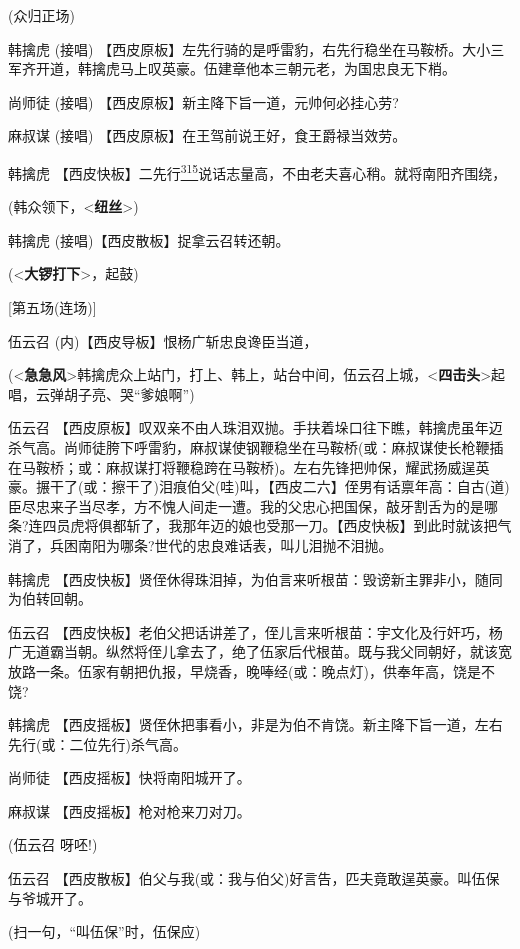 (众归正场)

韩擒虎 (接唱)
【西皮原板】左先行骑的是呼雷豹，右先行稳坐在马鞍桥。大小三军齐开道，韩擒虎马上叹英豪。伍建章他本三朝元老，为国忠良无下梢。

尚师徒 (接唱) 【西皮原板】新主降下旨一道，元帅何必挂心劳?

麻叔谋 (接唱) 【西皮原板】在王驾前说王好，食王爵禄当效劳。

韩擒虎
【西皮快板】二先行\protect\hyperlink{fn315}{\textsuperscript{315}}说话志量高，不由老夫喜心稍。就将南阳齐围绕，

(韩众领下，\textless{}\textbf{纽丝}\textgreater{})

韩擒虎 (接唱)【西皮散板】捉拿云召转还朝。

(\textless{}\textbf{大锣打下}\textgreater{}，起鼓)

{[}第五场(连场){]}

伍云召 (内)【西皮导板】恨杨广斩忠良谗臣当道，

(\textless{}\textbf{急急风}\textgreater{}韩擒虎众上站门，打上、韩上，站台中间，伍云召上城，\textless{}\textbf{四击头}\textgreater{}起唱，云弹胡子亮、哭``爹娘啊'')

伍云召
【西皮原板】叹双亲不由人珠泪双抛。手扶着垛口往下瞧，韩擒虎虽年迈杀气高。尚师徒胯下呼雷豹，麻叔谋使钢鞭稳坐在马鞍桥(或：麻叔谋使长枪鞭插在马鞍桥；或：麻叔谋打将鞭稳跨在马鞍桥)。左右先锋把帅保，耀武扬威逞英豪。搌干了(或：擦干了)泪痕伯父(哇)叫，【西皮二六】侄男有话禀年高：自古(道)臣尽忠来子当尽孝，方不愧人间走一遭。我的父忠心把国保，敲牙割舌为的是哪条?连四员虎将俱都斩了，我那年迈的娘也受那一刀。【西皮快板】到此时就该把气消了，兵困南阳为哪条?世代的忠良难话表，叫儿泪抛不泪抛。

韩擒虎
【西皮快板】贤侄休得珠泪掉，为伯言来听根苗：毁谤新主罪非小，随同为伯转回朝。

伍云召
【西皮快板】老伯父把话讲差了，侄儿言来听根苗：宇文化及行奸巧，杨广无道霸当朝。纵然将侄儿拿去了，绝了伍家后代根苗。既与我父同朝好，就该宽放路一条。伍家有朝把仇报，早烧香，晚唪经(或：晚点灯)，供奉年高，饶是不饶?

韩擒虎
【西皮摇板】贤侄休把事看小，非是为伯不肯饶。新主降下旨一道，左右先行(或：二位先行)杀气高。

尚师徒 【西皮摇板】快将南阳城开了。

麻叔谋 【西皮摇板】枪对枪来刀对刀。

(伍云召 呀呸!)

伍云召
【西皮散板】伯父与我(或：我与伯父)好言告，匹夫竟敢逞英豪。叫伍保与爷城开了。

(扫一句，``叫伍保''时，伍保应)

